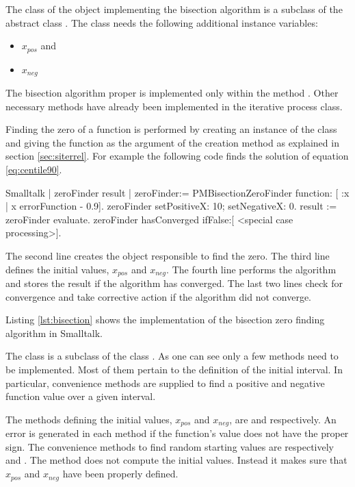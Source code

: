 The class of the object implementing the bisection algorithm is a subclass of the abstract class .
The class  needs the following additional instance variables:
\begin{itemize}
  \item {} $x_{pos}$ and
  \item {} $x_{neg}$
\end{itemize}
The bisection algorithm proper is implemented only within the method .
Other necessary methods have already been implemented in the iterative process class.

Finding the zero of a function is performed by creating an
instance of the class  and giving the
function as the argument of the creation method as explained in
section \ref{sec:siterrel}. For example the following code finds
the solution of equation \ref{eq:centile90}.
\begin{displaycode}{Smalltalk}
| zeroFinder result |
zeroFinder:= PMBisectionZeroFinder function: [ :x | x errorFunction - 0.9].
zeroFinder setPositiveX: 10; setNegativeX: 0.
result := zeroFinder evaluate. zeroFinder
hasConverged
   ifFalse:[ <special case processing>].
\end{displaycode}
The second line creates the object responsible to find the zero.
The third line defines the initial values, $x_{pos}$ and $x_{neg}$.
The fourth line performs the algorithm and stores the result if the algorithm has converged.
The last two lines check for convergence and take corrective action if the algorithm did not converge.

Listing \ref{lst:bisection} shows the implementation of the bisection zero finding algorithm in Smalltalk.

The class  is a subclass of the class . As one can see only a few methods need to be implemented.
Most of them pertain to the definition of the initial interval.
In particular, convenience methods are supplied to find a positive and negative function value over a given interval.

The methods defining the initial values, $x_{pos}$ and $x_{neg}$, are  and  respectively.
An error is generated in each method if the function's value does not have the proper sign.
The convenience methods to find random starting values are respectively  and .
The method  does not compute the initial values. Instead it makes sure that $x_{pos}$ and $x_{neg}$ have been properly defined.

